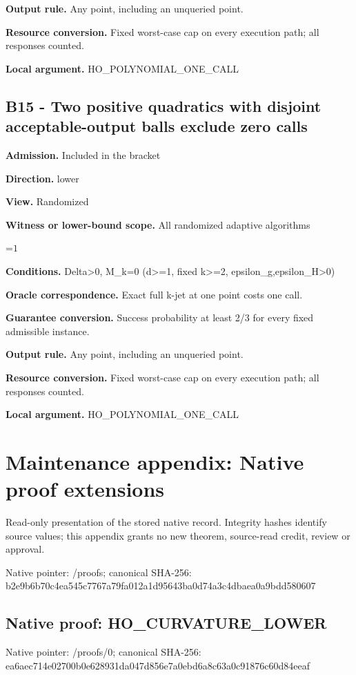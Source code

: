 \documentclass[10pt,a4paper]{article}
\newcommand{\AtlasMath}[1]{\par\begingroup\centering\setbox0=\hbox{$\displaystyle #1$}\ifdim\wd0>1.4\linewidth\typeout{ATLAS WIDE FORMULA: \the\wd0}\fi\ifdim\wd0>\linewidth\resizebox{\linewidth}{!}{\box0}\else\box0\fi\par\endgroup}
\begin{document}
\textbf{Output rule.} Any point, including an unqueried point.

\textbf{Resource conversion.} Fixed worst-case cap on every execution path; all responses counted.

\textbf{Local argument.} HO\_\allowbreak{}POLYNOMIAL\_\allowbreak{}ONE\_\allowbreak{}CALL

\subsection{B15 - Two positive quadratics with disjoint acceptable-output balls exclude zero calls}
\textbf{Admission.} Included in the bracket

\textbf{Direction.} lower

\textbf{View.} Randomized

\textbf{Witness or lower-bound scope.} All randomized adaptive algorithms

\AtlasMath{1}
\textbf{Conditions.} Delta>0, M\_\allowbreak{}k=0 (d>=1, fixed k>=2, epsilon\_\allowbreak{}g,epsilon\_\allowbreak{}H>0)

\textbf{Oracle correspondence.} Exact full k-jet at one point costs one call.

\textbf{Guarantee conversion.} Success probability at least 2/3 for every fixed admissible instance.

\textbf{Output rule.} Any point, including an unqueried point.

\textbf{Resource conversion.} Fixed worst-case cap on every execution path; all responses counted.

\textbf{Local argument.} HO\_\allowbreak{}POLYNOMIAL\_\allowbreak{}ONE\_\allowbreak{}CALL

\section{Maintenance appendix: Native proof extensions}
Read-only presentation of the stored native record. Integrity hashes identify source values; this appendix grants no new theorem, source-read credit, review or approval.

Native pointer: /proofs; canonical SHA-256: b2e9b6b70c4ea545c7767a79fa012a1d95643ba0d74a3c4dbaea0a9bdd580607

\subsection{Native proof: HO\_\allowbreak{}CURVATURE\_\allowbreak{}LOWER}
Native pointer: /proofs/0; canonical SHA-256: ea6aec714e02700b0e628931da047d856e7a0ebd6a8c63a0c91876c60d84eeaf
\end{document}
